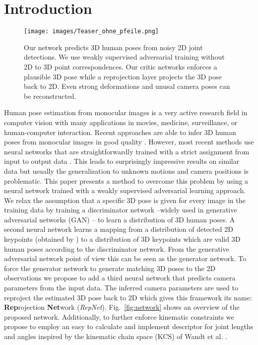 \documentclass[10pt,twocolumn,letterpaper]{article}
\begin{document}
\section{Introduction}
\begin{figure}
	\centering
	\texttt{[image: images/Teaser\_ohne\_pfeile.png]}
	\caption{Our network predicts 3D human poses from noisy 2D joint detections. We use weakly supervised adversarial training without 2D to 3D point correspondences. Our critic networks enforces a plausible 3D pose while a reprojection layer projects the 3D pose back to 2D. Even strong deformations and unusal camera poses can be reconstructed.}
	\label{fig:teaser}
\end{figure}
Human pose estimation from monocular images is a very active research field in computer vision with many  applications \eg in movies, medicine, surveillance, or human-computer interaction.
Recent approaches are able to infer 3D human poses from monocular images in good quality \cite{Park2016,Du2016,mpii3dhp2017,VNect_SIGGRAPH2017,Pavlakos2017,lcrnet2017,Moreno_cvpr2017,martinez_2017_3dbaseline,OriNet2018,Hossain2018}. 
However, most recent methods use neural networks that are straightforwardly trained with a strict assignment from input to output data \eg \cite{Park2016,Du2016,mpii3dhp2017,VNect_SIGGRAPH2017,Pavlakos2017,lcrnet2017,Moreno_cvpr2017,OriNet2018}.
This leads to surprisingly impressive results on similar data but usually the generalization to unknown motions and camera positions is problematic.
This paper presents a method to overcome this problem by using a neural network trained with a weakly supervised adversarial learning approach.
We relax the assumption that a specific 3D pose is given for every image in the training data by training a discriminator network --widely used in generative adversarial networks (GAN) \cite{Goodfellow2014}-- to learn a distribution of 3D human poses.
A second neural network learns a mapping from a distribution of detected 2D keypoints (obtained by \cite{StackedHourglassNewell2016}) to a distribution of 3D keypoints which are valid 3D human poses according to the discriminator network.
From the generative adversarial network point of view this can be seen as the generator network.
To force the generator network to generate matching 3D poses to the 2D observations we propose to add a third neural network that predicts camera parameters from the input data.
The inferred camera parameters are used to reproject the estimated 3D pose back to 2D which gives this framework its name: \textbf{Rep}rojection \textbf{Net}work (\textit{RepNet}).
Fig.~\ref{fig:network} shows an overview of the proposed network.
Additionally, to further enforce kinematic constraints we propose to employ an easy to calculate and implement descriptor for joint lengths and angles inspired by the kinematic chain space (KCS) of Wandt et al. \cite{WanAck2018a}.
\end{document}
